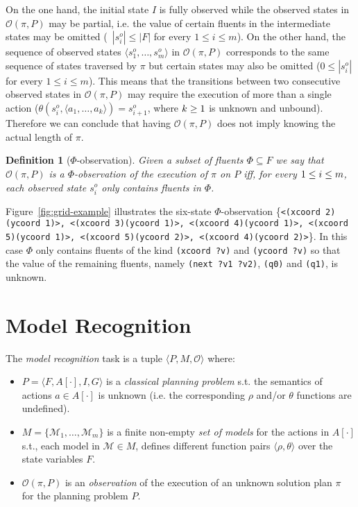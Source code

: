 \documentclass[letterpaper]{article} %
\newcommand{\tup}[1]{{\langle #1 \rangle}}
\newtheorem{definition}[theorem]{Definition}
\begin{document}
On the one hand, the initial state $I$ is fully observed while the observed states in $\mathcal{O}(\pi,P)$ may be partial, i.e. the value of certain fluents in the intermediate states may be omitted (~$|s_i^o|\leq |F|$ for every $1\leq i\leq m$). On the other hand, the sequence of observed states $\tup{s_1^o, \ldots, s_m^o}$ in $\mathcal{O}(\pi,P)$ corresponds to the same sequence of states traversed by $\pi$ but certain states may also be omitted ($0\leq|s_i^o|$ for every $1\leq i\leq m$). This means that the transitions between two consecutive observed states in $\mathcal{O}(\pi,P)$ may require the execution of more than a single action ($\theta(s_i^o,\tup{a_1,\ldots,a_k})=s_{i+1}^o$, where ${\small k\geq 1}$ is unknown and unbound). Therefore we can conclude that having $\mathcal{O}(\pi,P)$ does not imply knowing the actual length of $\pi$.

\begin{definition}[$\Phi$-observation]
Given a subset of fluents $\Phi\subseteq F$ we say that $\mathcal{O}(\pi,P)$ is a $\Phi$-observation of the execution of $\pi$ on $P$ iff, for every ${\small 1\leq i\leq m}$, each observed state $s_i^o$ only contains fluents in $\Phi$.
\end{definition}

Figure~\ref{fig:grid-example} illustrates the six-state $\Phi$-observation \{{\tt\scriptsize<(xcoord 2)(ycoord 1)>, <(xcoord 3)(ycoord 1)>, <(xcoord 4)(ycoord 1)>, <(xcoord 5)(ycoord 1)>, <(xcoord 5)(ycoord 2)>, <(xcoord 4)(ycoord 2)>}\}. In this case $\Phi$ only contains fluents of the kind {\tt\small (xcoord ?v)} and {\tt\small (ycoord ?v)} so that the value of the remaining fluents, namely {\tt\small (next ?v1 ?v2)}, {\tt\small (q0)} and {\tt\small (q1)}, is unknown.



\section{Model Recognition}
\label{sec:recognition}
The {\em model recognition} task is a tuple $\tup{P,M,\mathcal{O}}$ where:
\begin{itemize}
\item $P=\tup{F,A[\cdot],I,G}$ is a {\em classical planning problem} s.t. the semantics of actions $a\in A[\cdot]$ is unknown (i.e. the corresponding $\rho$ and/or $\theta$ functions are undefined).
\item $M=\{\mathcal{M}_1,\ldots,\mathcal{M}_m\}$ is a finite non-empty {\em set of models} for the actions in $A[\cdot]$ s.t., each model in $\mathcal{M}\in M$, defines different function pairs $\tup{\rho,\theta}$ over the state variables $F$.
\item $\mathcal{O}(\pi,P)$ is an {\em observation} of the execution of an unknown solution plan $\pi$ for the planning problem $P$.
\end{itemize}
\end{document}
